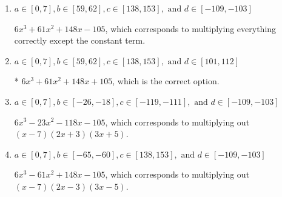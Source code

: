 \documentclass{extbook}[14pt]
\begin{document}
\begin{enumerate}
{\begin{enumerate}[label=\Alph*.]
$6x^{3} -41 x^{2} -22 x + 105$, which corresponds to multiplying out $(x -7)(2x -3)(3x + 5)$.
\item \( a \in [0, 7], b \in [59, 62], c \in [138, 153], \text{ and } d \in [-109, -103] \)

$6x^{3} +61 x^{2} +148 x -105$, which corresponds to multiplying everything correctly except the constant term.
\item \( a \in [0, 7], b \in [59, 62], c \in [138, 153], \text{ and } d \in [101, 112] \)

* $6x^{3} +61 x^{2} +148 x + 105$, which is the correct option.
\item \( a \in [0, 7], b \in [-26, -18], c \in [-119, -111], \text{ and } d \in [-109, -103] \)

$6x^{3} -23 x^{2} -118 x -105$, which corresponds to multiplying out $(x -7)(2x + 3)(3x + 5)$.
\item \( a \in [0, 7], b \in [-65, -60], c \in [138, 153], \text{ and } d \in [-109, -103] \)

$6x^{3} -61 x^{2} +148 x -105$, which corresponds to multiplying out $(x -7)(2x -3)(3x -5)$.
\end{enumerate}

}
\end{enumerate}
\end{document}
